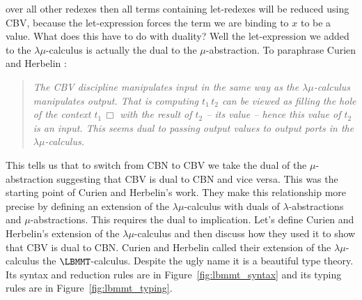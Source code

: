 over all other redexes then all terms containing let-redexes will be
reduced using CBV, because the let-expression forces the term we are
binding to $x$ to be a value.  What does this have to do with duality?
Well the let-expression we added to the $\lambda\mu$-calculus is
actually the dual to the $\mu$-abstraction.  To paraphrase Curien and
Herbelin \cite{Curien:2000}:
\begin{quote}
  \emph{The CBV discipline manipulates input in the same way as the
  $\lambda\mu$-calculus manipulates output.  That is computing
  $t_1\,t_2$ can be viewed as filling the hole of the context
  $t_1\,\Box$ with the result of $t_2$ -- its value -- hence this
  value of $t_2$ is an input.  This seems dual to passing output
  values to output ports in the $\lambda\mu$-calculus.}
\end{quote}
This tells us that to switch from CBN to CBV we take the dual of the
$\mu$-abstraction suggesting that CBV is dual to CBN and vice versa.
This was the starting point of Curien and Herbelin's work.  They make
this relationship more precise by defining an extension of the
$\lambda\mu$-calculus with duals of $\lambda$-abstractions and
$\mu$-abstractions.  This requires the dual to implication.  Let's
define Curien and Herbelin's extension of the $\lambda\mu$-calculus
and then discuss how they used it to show that CBV is dual to CBN.
Curien and Herbelin called their extension of the $\lambda\mu$-calculus
the $\LBMMT$-calculus.  Despite the ugly name it is a beautiful type
theory.  Its syntax and reduction rules are in
Figure~\ref{fig:lbmmt_syntax} and its typing rules are in Figure~\ref{fig:lbmmt_typing}.
